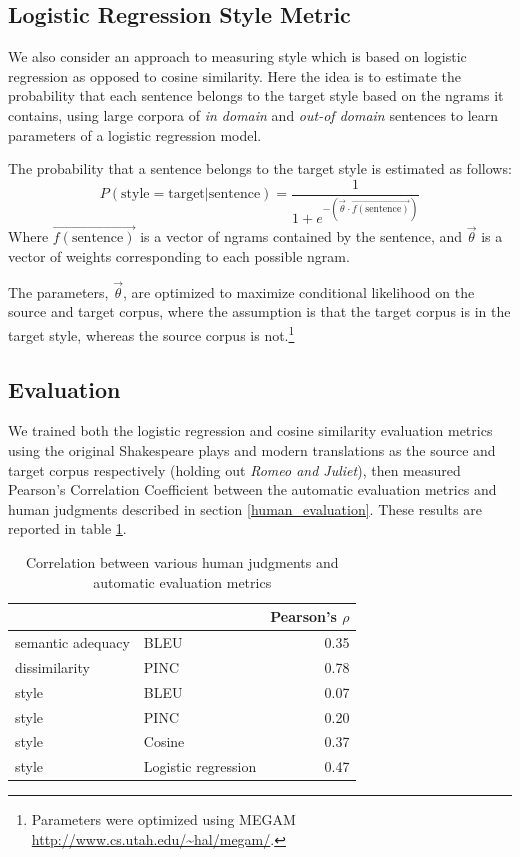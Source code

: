 \documentclass[10pt,a5paper,twoside]{article}
\begin{document}
\subsection{Logistic Regression Style Metric}
We also consider an approach to measuring style which is based on logistic regression as opposed to cosine similarity.
Here the idea is to estimate the probability that each
sentence belongs to the target style based on the ngrams it contains, using large corpora of \emph{in domain} and \emph{out-of domain} sentences to learn  parameters of a logistic regression model.

The probability that a sentence belongs to the target style is estimated as follows:
\[
P(\text{style} = \text{target}|\text{sentence}) = \frac{1}{1 + e^{-\left( \vec{\theta} \cdot \vec{f(\text{sentence})} \right)}}
\]
Where $\vec{f(\text{sentence})}$ is a vector of ngrams contained by the sentence, and $\vec{\theta}$ is a vector of weights corresponding to each possible ngram.

The parameters, $\vec{\theta}$, are optimized to maximize conditional likelihood on the source and target corpus, where the assumption is that the target corpus
is in the target style, whereas the source corpus is not.\footnote{
  Parameters were optimized using MEGAM \url{http://www.cs.utah.edu/~hal/megam/}.
}

\subsection{Evaluation}
We trained both the logistic regression and cosine similarity evaluation metrics using the original Shakespeare plays and modern translations as
the source and target corpus respectively (holding out {\em Romeo and Juliet}), then measured Pearson's Correlation Coefficient between the automatic
evaluation metrics and human judgments described in section \ref{human_evaluation}.  These results are reported in table \ref{correlation}.

\begin{table}
  \begin{center}
  \begin{tabular}{|l|l|r|}
    \hline
    & & Pearson's $\rho$ \\
    \hline
    \hline
    semantic adequacy & BLEU & 0.35 \\
    \hline
    dissimilarity & PINC & 0.78 \\
    \hline
    style & BLEU & 0.07 \\
    \hline
    style & PINC & 0.20 \\
    \hline
    style & Cosine & 0.37 \\
    \hline
    style & Logistic regression & 0.47 \\
    \hline
  \end{tabular}
  \end{center}
  \caption{Correlation between various human judgments and automatic evaluation metrics}
  \label{correlation}
\end{table}
\end{document}
